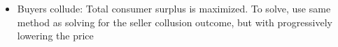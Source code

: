 \documentclass{article}
\begin{document}
\begin{itemize}
\begin{itemize}
			\item Buyers collude: Total consumer surplus is maximized. To solve, use same method as solving for the seller collusion outcome, but with progressively lowering the price
		\end{itemize}
\end{itemize}


\end{document}
